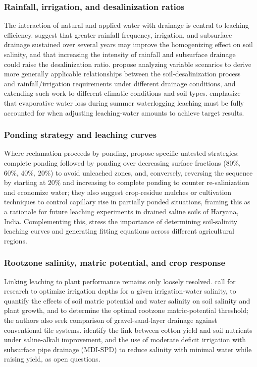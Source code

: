 \documentclass[11pt]{article}
\begin{document}
\subsubsection{Rainfall, irrigation, and desalinization ratios}

The interaction of natural and applied water with drainage is central to leaching efficiency. \textcite{Yu2015} suggest that greater rainfall frequency, irrigation, and subsurface drainage sustained over several years may improve the homogenizing effect on soil salinity, and that increasing the intensity of rainfall and subsurface drainage could raise the desalinization ratio. \textcite{Chen2025} propose analyzing variable scenarios to derive more generally applicable relationships between the soil-desalinization process and rainfall/irrigation requirements under different drainage conditions, and extending such work to different climatic conditions and soil types. \textcite{Wang2024d} emphasize that evaporative water loss during summer waterlogging leaching must be fully accounted for when adjusting leaching-water amounts to achieve target results.

\subsubsection{Ponding strategy and leaching curves}

Where reclamation proceeds by ponding, \textcite{RAO1991} propose specific untested strategies: complete ponding followed by ponding over decreasing surface fractions (80\%, 60\%, 40\%, 20\%) to avoid unleached zones, and, conversely, reversing the sequence by starting at 20\% and increasing to complete ponding to counter re-salinization and economize water; they also suggest crop-residue mulches or cultivation techniques to control capillary rise in partially ponded situations, framing this as a rationale for future leaching experiments in drained saline soils of Haryana, India. Complementing this, \textcite{Yang2022c} stress the importance of determining soil-salinity leaching curves and generating fitting equations across different agricultural regions.

\subsubsection{Rootzone salinity, matric potential, and crop response}

Linking leaching to plant performance remains only loosely resolved. \textcite{Zhang2021} call for research to optimize irrigation depths for a given irrigation-water salinity, to quantify the effects of soil matric potential and water salinity on soil salinity and plant growth, and to determine the optimal rootzone matric-potential threshold; the authors also seek comparison of gravel-sand-layer drainage against conventional tile systems. \textcite{Heng2021} identify the link between cotton yield and soil nutrients under saline-alkali improvement, and the use of moderate deficit irrigation with subsurface pipe drainage (MDI-SPD) to reduce salinity with minimal water while raising yield, as open questions.
\end{document}
